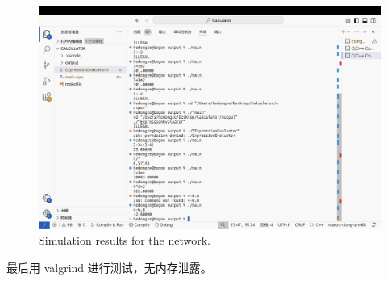 \documentclass[UTF8]{ctexart}
\begin{document}
\begin{figure}[!t]
	\centering
	\includegraphics[width=5in]{test.png}
	\caption{Simulation results for the network.}
	\label{fig_sim}
\end{figure}

最后用 valgrind 进行测试，无内存泄露。
\end{document}
